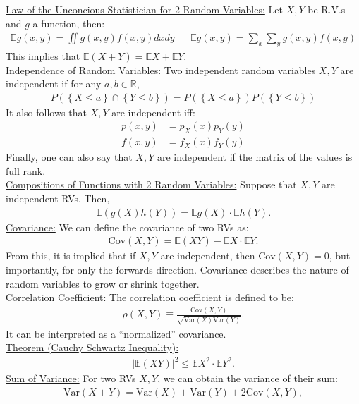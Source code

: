 \documentclass{article}
\newcommand{\sheader}[1]{\underline{#1:}}
\newcommand{\gap}{\medskip\\}
\newcommand{\curly}[1]{\left\{#1\right\}}
\begin{document}
\sheader{Law of the Unconcious Statistician for 2 Random Variables} Let $X, Y$ be R.V.s and $g$ a function, then:
\begin{align*}
    \mathbb{E}g(x, y) = \iint g(x, y)f(x, y)dxdy && \mathbb{E}g(x, y) = \sum_x\sum_y g(x, y)f(x, y)
\end{align*}
This implies that $\mathbb{E}(X + Y) = \mathbb{E}X + \mathbb{E}Y$.
\gap
\sheader{Independence of Random Variables} Two independent random variables $X, Y$ are independent if
for any $a, b \in \mathbb{R}$,
\begin{align*}
    P\left(\curly{X \leq a} \cap \curly{Y \leq b}\right) = P\left(\curly{X \leq a}\right) P\left(\curly{Y \leq b}\right)
\end{align*}
It also follows that $X, Y$ are independent iff:
\begin{align*}
    p(x, y) &= p_X(x)p_Y(y)\\
    f(x, y) &= f_X(x)f_Y(y)
\end{align*}
Finally, one can also say that $X, Y$ are independent if the matrix of the values is full rank.
\gap
\sheader{Compositions of Functions with 2 Random Variables} Suppose that 
$X, Y$ are independent RVs. Then,
\begin{align*}
    \mathbb{E}\left(g(X)h(Y)\right) = \mathbb{E}g(X) \cdot \mathbb{E}h(Y).
\end{align*}
\sheader{Covariance} We can define the covariance of two RVs as: 
\begin{align*}
    \textrm{Cov}(X, Y) = \mathbb{E}(XY) - \mathbb{E}X \cdot \mathbb{E}Y.
\end{align*}
From this, it is implied that if $X, Y$ are independent, then $\textrm{Cov}(X, Y) = 0$,
but importantly, for only the forwards direction. Covariance describes the nature 
of random variables to grow or shrink together.
\gap
\sheader{Correlation Coefficient} The correlation coefficient is defined to be:
\begin{align*}
    \rho(X, Y) \equiv \frac{\textrm{Cov}(X, Y)}{\sqrt{\textrm{Var}(X) \textrm{Var}(Y)}}.
\end{align*}
It can be interpreted as a ``normalized'' covariance.
\gap
\sheader{Theorem (Cauchy Schwartz Inequality)}
\begin{align*}
    \left|\mathbb{E}(XY)\right|^2 \leq \mathbb{E}X^2 \cdot \mathbb{E}Y^2.
\end{align*}
\sheader{Sum of Variance} For two RVs $X, Y$, we can obtain the variance of their sum:
\begin{align*}
    \textrm{Var}(X + Y) = \textrm{Var}(X) + \textrm{Var}(Y) + 2\textrm{Cov}(X, Y),
\end{align*}
\end{document}
